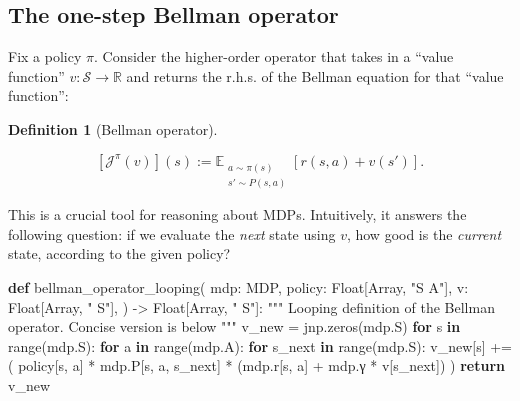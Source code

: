 \documentclass[
  letterpaper,
  DIV=11,
  numbers=noendperiod]{scrreprt}
\newenvironment{Shaded}{\begin{snugshade}}{\end{snugshade}}
\newcommand{\BuiltInTok}[1]{\textcolor[rgb]{0.00,0.23,0.31}{#1}}
\newcommand{\CommentTok}[1]{\textcolor[rgb]{0.37,0.37,0.37}{#1}}
\newcommand{\ControlFlowTok}[1]{\textcolor[rgb]{0.00,0.23,0.31}{\textbf{#1}}}
\newcommand{\KeywordTok}[1]{\textcolor[rgb]{0.00,0.23,0.31}{\textbf{#1}}}
\newcommand{\NormalTok}[1]{\textcolor[rgb]{0.00,0.23,0.31}{#1}}
\newcommand{\OperatorTok}[1]{\textcolor[rgb]{0.37,0.37,0.37}{#1}}
\newcommand{\StringTok}[1]{\textcolor[rgb]{0.13,0.47,0.30}{#1}}
\theoremstyle{plain}
\theoremstyle{plain}
\theoremstyle{definition}
\theoremstyle{definition}
\newtheorem{definition}{Definition}[chapter]
\theoremstyle{remark}
\begin{document}
\subsection{The one-step Bellman
operator}\label{the-one-step-bellman-operator}

Fix a policy \(\pi\). Consider the higher-order operator that takes in a
``value function'' \(v : \mathcal{S} \to \mathbb{R}\) and returns the
r.h.s. of the Bellman equation for that ``value function'':

\begin{definition}[Bellman
operator]\protect\hypertarget{def-bellman_operator}{}\label{def-bellman_operator}

\[[\mathcal{J}^{\pi}(v)](s) := \mathbb{E}_{\substack{a \sim \pi(s) \\ s' \sim P(s, a)}} [r(s, a) + v(s')].\]

This is a crucial tool for reasoning about MDPs. Intuitively, it answers
the following question: if we evaluate the \emph{next} state using
\(v\), how good is the \emph{current} state, according to the given
policy?

\end{definition}

\begin{Shaded}
\begin{Highlighting}[]
\KeywordTok{def}\NormalTok{ bellman\_operator\_looping(}
\NormalTok{    mdp: MDP,}
\NormalTok{    policy: Float[Array, }\StringTok{"S A"}\NormalTok{],}
\NormalTok{    v: Float[Array, }\StringTok{" S"}\NormalTok{],}
\NormalTok{) }\OperatorTok{{-}\textgreater{}}\NormalTok{ Float[Array, }\StringTok{" S"}\NormalTok{]:}
    \CommentTok{"""}
\CommentTok{    Looping definition of the Bellman operator.}
\CommentTok{    Concise version is below}
\CommentTok{    """}
\NormalTok{    v\_new }\OperatorTok{=}\NormalTok{ jnp.zeros(mdp.S)}
    \ControlFlowTok{for}\NormalTok{ s }\KeywordTok{in} \BuiltInTok{range}\NormalTok{(mdp.S):}
        \ControlFlowTok{for}\NormalTok{ a }\KeywordTok{in} \BuiltInTok{range}\NormalTok{(mdp.A):}
            \ControlFlowTok{for}\NormalTok{ s\_next }\KeywordTok{in} \BuiltInTok{range}\NormalTok{(mdp.S):}
\NormalTok{                v\_new[s] }\OperatorTok{+=}\NormalTok{ (}
\NormalTok{                    policy[s, a]}
                    \OperatorTok{*}\NormalTok{ mdp.P[s, a, s\_next]}
                    \OperatorTok{*}\NormalTok{ (mdp.r[s, a] }\OperatorTok{+}\NormalTok{ mdp.γ }\OperatorTok{*}\NormalTok{ v[s\_next])}
\NormalTok{                )}
    \ControlFlowTok{return}\NormalTok{ v\_new}
\end{Highlighting}
\end{Shaded}
\end{document}
